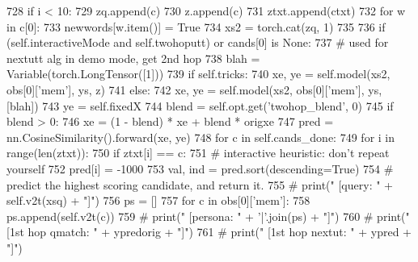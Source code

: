 \begin{DoxyCode}
728                         \textcolor{keywordflow}{if} i < 10:
729                             zq.append(c)
730                         z.append(c)
731                         ztxt.append(ctxt)
732                         \textcolor{keywordflow}{for} w \textcolor{keywordflow}{in} c[0]:
733                             newwords[w.item()] = \textcolor{keyword}{True}
734                     xs2 = torch.cat(zq, 1)
735 
736                 \textcolor{keywordflow}{if} (self.interactiveMode \textcolor{keywordflow}{and} self.twohoputt) \textcolor{keywordflow}{or} cands[0] \textcolor{keywordflow}{is} \textcolor{keywordtype}{None}:
737                     \textcolor{comment}{# used for nextutt alg in demo mode, get 2nd hop}
738                     blah = Variable(torch.LongTensor([1]))
739                     \textcolor{keywordflow}{if} self.tricks:
740                         xe, ye = self.model(xs2, obs[0][\textcolor{stringliteral}{'mem'}], ys, z)
741                     \textcolor{keywordflow}{else}:
742                         xe, ye = self.model(xs2, obs[0][\textcolor{stringliteral}{'mem'}], ys, [blah])
743                         ye = self.fixedX
744                     blend = self.opt.get(\textcolor{stringliteral}{'twohop\_blend'}, 0)
745                     \textcolor{keywordflow}{if} blend > 0:
746                         xe = (1 - blend) * xe + blend * origxe
747                     pred = nn.CosineSimilarity().forward(xe, ye)
748                     \textcolor{keywordflow}{for} c \textcolor{keywordflow}{in} self.cands\_done:
749                         \textcolor{keywordflow}{for} i \textcolor{keywordflow}{in} range(len(ztxt)):
750                             \textcolor{keywordflow}{if} ztxt[i] == c:
751                                 \textcolor{comment}{# interactive heuristic: don't repeat yourself}
752                                 pred[i] = -1000
753                     val, ind = pred.sort(descending=\textcolor{keyword}{True})
754                     \textcolor{comment}{# predict the highest scoring candidate, and return it.}
755                     \textcolor{comment}{# print("   [query:          " + self.v2t(xsq) + "]")}
756                     ps = []
757                     \textcolor{keywordflow}{for} c \textcolor{keywordflow}{in} obs[0][\textcolor{stringliteral}{'mem'}]:
758                         ps.append(self.v2t(c))
759                     \textcolor{comment}{# print("   [persona:        " + '|'.join(ps) + "]")}
760                     \textcolor{comment}{# print("   [1st hop qmatch: " + ypredorig + "]")}
761                     \textcolor{comment}{# print("   [1st hop nextut: " + ypred + "]")}

\end{DoxyCode}

